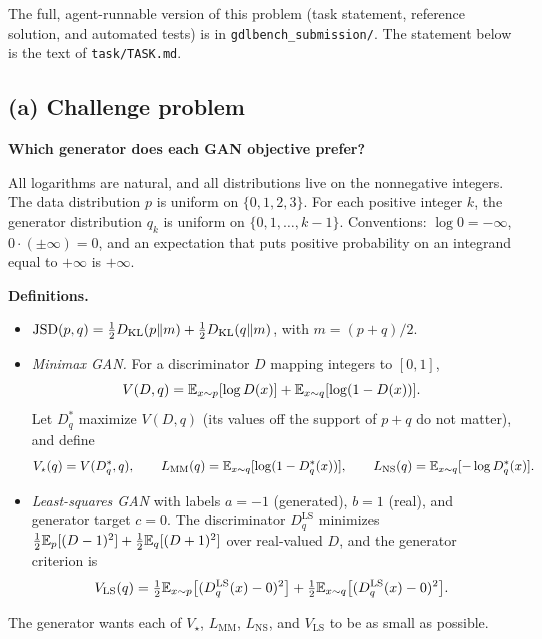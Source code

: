 The full, agent-runnable version of this problem (task statement, reference
solution, and automated tests) is in \texttt{gdlbench\_submission/}. The
statement below is the text of \texttt{task/TASK.md}.

\subsection{(a) Challenge problem}

\textbf{Which generator does each GAN objective prefer?}

All logarithms are natural, and all distributions live on the nonnegative
integers. The data distribution \(p\) is uniform on \(\{0,1,2,3\}\). For each
positive integer \(k\), the generator distribution \(q_k\) is uniform on
\(\{0,1,\dots,k-1\}\). Conventions: \(\log 0=-\infty\),
\(0\cdot(\pm\infty)=0\), and an expectation that puts positive probability on
an integrand equal to \(+\infty\) is \(+\infty\).

\medskip\noindent\textbf{Definitions.}
\begin{itemize}
  \item \(\mathrm{JSD}(p,q)=\tfrac12D_{\mathrm{KL}}(p\|m)+\tfrac12D_{\mathrm{KL}}(q\|m)\), with \(m=(p+q)/2\).
  \item \emph{Minimax GAN.} For a discriminator \(D\) mapping integers to \([0,1]\),
  \[
    V(D,q)=\mathbb{E}_{x\sim p}[\log D(x)]+\mathbb{E}_{x\sim q}[\log(1-D(x))].
  \]
  Let \(D^*_q\) maximize \(V(D,q)\) (its values off the support of \(p+q\) do
  not matter), and define
  \[
    V_\star(q)=V(D^*_q,q),\qquad
    L_{\mathrm{MM}}(q)=\mathbb{E}_{x\sim q}[\log(1-D^*_q(x))],\qquad
    L_{\mathrm{NS}}(q)=\mathbb{E}_{x\sim q}[-\log D^*_q(x)].
  \]
  \item \emph{Least-squares GAN} with labels \(a=-1\) (generated), \(b=1\)
  (real), and generator target \(c=0\). The discriminator \(D^{\mathrm{LS}}_q\)
  minimizes \(\tfrac12\mathbb{E}_p[(D-1)^2]+\tfrac12\mathbb{E}_q[(D+1)^2]\) over real-valued
  \(D\), and the generator criterion is
  \[
    V_{\mathrm{LS}}(q)=\tfrac12\mathbb{E}_{x\sim p}\bigl[(D^{\mathrm{LS}}_q(x)-0)^2\bigr]
    +\tfrac12\mathbb{E}_{x\sim q}\bigl[(D^{\mathrm{LS}}_q(x)-0)^2\bigr].
  \]
\end{itemize}
The generator wants each of \(V_\star\), \(L_{\mathrm{MM}}\),
\(L_{\mathrm{NS}}\), and \(V_{\mathrm{LS}}\) to be as small as possible.

